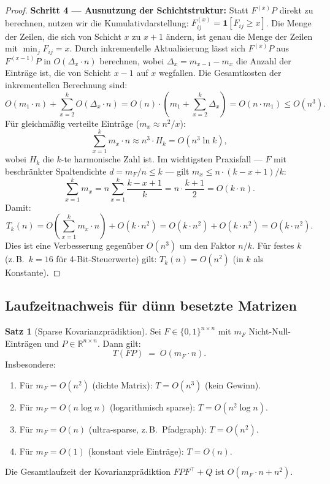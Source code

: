 ﻿\documentclass[a4paper,12pt]{article}
\theoremstyle{definition}
\newtheorem{satz}{Satz}
\begin{document}
\begin{proof}
\textbf{Schritt 4 --- Ausnutzung der Schichtstruktur:}
Statt $F^{(x)}P$ direkt zu berechnen, nutzen wir die Kumulativdarstellung:
$F^{(x)}_{ij} = \mathbf{1}[F_{ij} \geq x]$.
Die Menge der Zeilen, die sich von Schicht $x$ zu $x+1$ ändern, ist genau die
Menge der Zeilen mit $\min_j F_{ij} = x$. Durch inkrementelle Aktualisierung
lässt sich $F^{(x)}P$ aus $F^{(x-1)}P$ in $O(\Delta_x \cdot n)$ berechnen,
wobei $\Delta_x = m_{x-1} - m_x$ die Anzahl der Einträge ist, die von Schicht
$x-1$ auf $x$ wegfallen.
Die Gesamtkosten der inkrementellen Berechnung sind:
\[
    O(m_1 \cdot n) + \sum_{x=2}^{k} O(\Delta_x \cdot n)
    = O(n) \cdot \left(m_1 + \sum_{x=2}^{k} \Delta_x\right)
    = O(n \cdot m_1)
    \leq O(n^3).
\]
Für gleichmäßig verteilte Einträge ($m_x \approx n^2/x$):
\[
    \sum_{x=1}^{k} m_x \cdot n \approx n^3 \cdot H_k = O(n^3 \ln k),
\]
wobei $H_k$ die $k$-te harmonische Zahl ist.
Im wichtigsten Praxisfall --- $F$ mit beschränkter Spaltendichte
$d = m_F/n \leq k$ --- gilt $m_x \leq n \cdot (k - x + 1)/k$:
\[
    \sum_{x=1}^k m_x = n \sum_{x=1}^k \frac{k-x+1}{k}
    = n \cdot \frac{k+1}{2}
    = O(k \cdot n).
\]
Damit:
\[
    T_k(n) = O\!\left(\sum_{x=1}^k m_x \cdot n\right) + O(k \cdot n^2)
    = O(k \cdot n^2) + O(k \cdot n^2)
    = O(k \cdot n^2).
\]
Dies ist eine Verbesserung gegenüber $O(n^3)$ um den Faktor $n/k$.
Für festes $k$ (z.\,B.\ $k = 16$ für 4-Bit-Steuerwerte) gilt:
$T_k(n) = O(n^2)$ (in $k$ als Konstante).
\end{proof}

\subsection{Laufzeitnachweis für dünn besetzte Matrizen}

\begin{satz}[Sparse Kovarianzprädiktion]
\label{satz:sparse}
    Sei $F \in \{0,1\}^{n\times n}$ mit $m_F$ Nicht-Null-Einträgen und
    $P \in \mathbb{R}^{n\times n}$. Dann gilt:
    \[
        T(FP) \;=\; O(m_F \cdot n).
    \]
    Insbesondere:
    \begin{enumerate}
        \item Für $m_F = O(n^2)$ (dichte Matrix): $T = O(n^3)$ (kein Gewinn).
        \item Für $m_F = O(n \log n)$ (logarithmisch sparse): $T = O(n^2 \log n)$.
        \item Für $m_F = O(n)$ (ultra-sparse, z.\,B.\ Pfadgraph): $T = O(n^2)$.
        \item Für $m_F = O(1)$ (konstant viele Einträge): $T = O(n)$.
    \end{enumerate}
    Die Gesamtlaufzeit der Kovarianzprädiktion $FPF^\top + Q$ ist $O(m_F \cdot n + n^2)$.
\end{satz}
\end{document}
